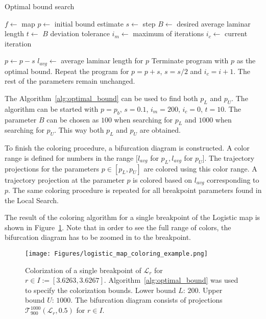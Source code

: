 \begin{algorithm}[!h]
    \caption{Optimal bound search}
    \label{alg:optimal_bound}
    \begin{algorithmic}[1]
        \Statex $f \gets$ map
        \Statex $p \gets$ initial bound estimate
        \Statex $s \gets$ step
        \Statex $B \gets$ desired average laminar length
        \Statex $t \gets$ $B$ deviation tolerance
        \Statex $i_{m} \gets$ maximum of iterations
        \Statex $i_{c} \gets$ current iteration

            \State $p \gets p - s$
            \State $l_{avg} \gets$ average laminar length for $p$
                \State Terminate program with $p$ as the optimal bound.
            \EndIf
                \State Repeat the program for $p = p+s$, $s = s/2$ and $i_{c} = i+1$. The rest of the parameters remain unchanged.
            \EndIf
        \EndFor
    \end{algorithmic}
\end{algorithm}

The Algorithm~\ref{alg:optimal_bound} can be used to find both $p_L$ and $p_U$.
The algorithm can be started with $p = p_b$, $s = 0.1$, $i_{m} = 200$, $i_{c} = 0$, $t = 10$.
The parameter $B$ can be chosen as $100$ when searching for $p_{L}$ and $1000$ when searching for $p_{U}$.
This way both $p_L$ and $p_U$ are obtained.
\par
To finish the coloring procedure, a bifurcation diagram is constructed.
A color range is defined for numbers in the range $[ l_{avg}$ for $p_L, l_{avg}$ for $p_U ]$.
The trajectory projections for the parameters $p \in [ p_L, p_U ]$ are colored using this color range.
A trajectory projection at the parameter $p$ is colored based on $l_{avg}$ corresponding to $p$.
The same coloring procedure is repeated for all breakpoint parameters found in the Local Search.
\par
The result of the coloring algorithm for a single breakpoint of the Logistic map is shown in Figure~\ref{fig:coloring_example}.
Note that in order to see the full range of colors, the bifurcation diagram has to be zoomed in to the breakpoint.

\begin{figure}[!h]
    \centering
    \texttt{[image: Figures/logistic\_map\_coloring\_example.png]}
    \caption{
        Colorization of a single breakpoint of $\mathcal{L}_{r}$ for $r \in I := [ 3.6263, 3.6267 ]$.
        Algorithm~\ref{alg:optimal_bound} was used to specify the colorization bounds.
        Lower bound $L$: $200$.
        Upper bound $U$: $1000$.
        The bifurcation diagram consists of projections $\mathcal{T}_{900}^{1000}(\mathcal{L}_{r}, 0.5)$ for $r \in I$.
    }
    \label{fig:coloring_example}
\end{figure}

